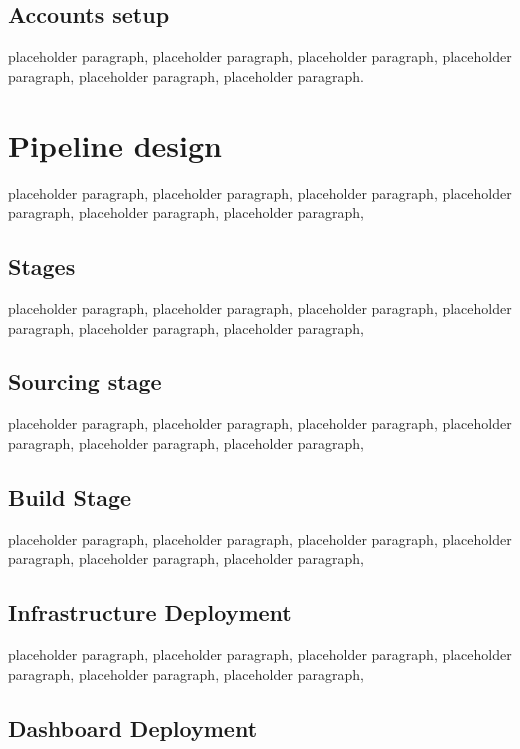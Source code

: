 \subsection{Accounts setup}

placeholder paragraph, placeholder paragraph, placeholder paragraph, placeholder paragraph, placeholder paragraph, placeholder paragraph.

\section{Pipeline design}
\qquad 

placeholder paragraph, placeholder paragraph, placeholder paragraph, placeholder paragraph, placeholder paragraph, placeholder paragraph,
\subsection{Stages}


\qquad placeholder paragraph, placeholder paragraph, placeholder paragraph, placeholder paragraph, placeholder paragraph, placeholder paragraph,

\subsection{Sourcing stage}


\qquad placeholder paragraph, placeholder paragraph, placeholder paragraph, placeholder paragraph, placeholder paragraph, placeholder paragraph,

\subsection{Build Stage}
\qquad placeholder paragraph, placeholder paragraph, placeholder paragraph, placeholder paragraph, placeholder paragraph, placeholder paragraph,

\subsection{Infrastructure Deployment}

\quad
placeholder paragraph, placeholder paragraph, placeholder paragraph, placeholder paragraph, placeholder paragraph, placeholder paragraph,



\subsection{Dashboard Deployment}

